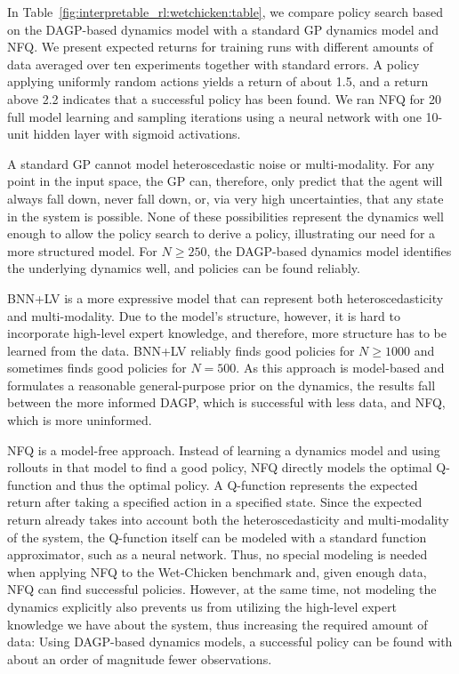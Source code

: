 In Table~\ref{fig:interpretable_rl:wetchicken:table}, we compare policy search based on the DAGP-based dynamics model with a standard GP dynamics model and NFQ.
We present expected returns for training runs with different amounts of data averaged over ten experiments together with standard errors.
A policy applying uniformly random actions yields a return of about \num{1.5}, and a return above \num{2.2} indicates that a successful policy has been found.
We ran NFQ for 20 full model learning and sampling iterations using a neural network with one 10-unit hidden layer with sigmoid activations.

A standard GP cannot model heteroscedastic noise or multi-modality.
For any point in the input space, the GP can, therefore, only predict that the agent will always fall down, never fall down, or, via very high uncertainties, that any state in the system is possible.
None of these possibilities represent the dynamics well enough to allow the policy search to derive a policy, illustrating our need for a more structured model.
For $N \geq 250$, the DAGP-based dynamics model identifies the underlying dynamics well, and policies can be found reliably.

BNN+LV is a more expressive model that can represent both heteroscedasticity and multi-modality.
Due to the model's structure, however, it is hard to incorporate high-level expert knowledge, and therefore, more structure has to be learned from the data.
BNN+LV reliably finds good policies for $N \geq 1000$ and sometimes finds good policies for $N = 500$.
As this approach is model-based and formulates a reasonable general-purpose prior on the dynamics, the results fall between the more informed DAGP, which is successful with less data, and NFQ, which is more uninformed.

NFQ is a model-free approach.
Instead of learning a dynamics model and using rollouts in that model to find a good policy, NFQ directly models the optimal Q-function and thus the optimal policy.
A Q-function represents the expected return after taking a specified action in a specified state.
Since the expected return already takes into account both the heteroscedasticity and multi-modality of the system, the Q-function itself can be modeled with a standard function approximator, such as a neural network.
Thus, no special modeling is needed when applying NFQ to the Wet-Chicken benchmark and, given enough data, NFQ can find successful policies.
However, at the same time, not modeling the dynamics explicitly also prevents us from utilizing the high-level expert knowledge we have about the system, thus increasing the required amount of data:
Using DAGP-based dynamics models, a successful policy can be found with about an order of magnitude fewer observations.


